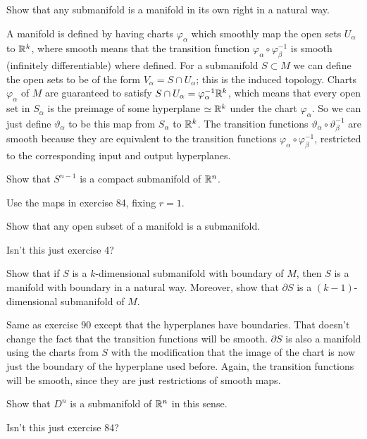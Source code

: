 \documentclass[a4paper,12pt]{report}
\numberwithin{equation}{section}
\begin{document}
\begin{p}%
{Show that any submanifold is a manifold in its own right in a natural way.}
\end{p}
{A manifold is defined by having charts $\varphi_\alpha$ which smoothly map the open sets $U_\alpha$ to $\mathbb{R}^k$, where smooth means that the transition function $\varphi_\alpha\circ\varphi_\beta^{-1}$ is smooth 
(infinitely differentiable) where defined. For a submanifold $S\subset M$ we can define the open sets to 
be of the form $V_\alpha=S\cap U_\alpha$; this is the induced topology. Charts $\varphi_\alpha$ of $M$ are
guaranteed to satisfy $S\cap U_\alpha=\varphi_\alpha^{-1}\mathbb{R}^k$, which means that every open set in $S_\alpha$ is the preimage of some hyperplane $\simeq\mathbb{R}^k$ under the chart $\varphi_\alpha$. So we can
just define $\vartheta_\alpha$ to be this map from $S_\alpha$ to $\mathbb{R}^k$. The transition functions
$\vartheta_\alpha\circ\vartheta_\beta^{-1}$ are smooth because they are equivalent to the transition
functions $\varphi_\alpha\circ\varphi_\beta^{-1}$, restricted to the corresponding input and output 
hyperplanes.}

\begin{p}%
{Show that $S^{n{-}1}$ is a compact submanifold of $\mathbb{R}^n$.}
\end{p}
{Use the maps in exercise 84, fixing $r=1$.}


\begin{p}%
{Show that any open subset of a manifold is a submanifold.}
\end{p}
{Isn't this just exercise 4?}

\begin{p}%
{Show that if $S$ is a $k$-dimensional submanifold 
with boundary of $M$, then $S$ is a manifold with boundary in a natural way. 
Moreover, show that $\partial S$ is a $(k{-}1)$-dimensional 
submanifold of $M$.}
\end{p}
{Same as exercise 90 except that the hyperplanes have boundaries.
That doesn't change the fact that the transition functions will be smooth. $\partial S$
is also a manifold using the charts from $S$ with the modification that the image of
the chart is now just the boundary of the hyperplane used before. Again, the transition
functions will be smooth, since they are just restrictions of smooth maps. }

\begin{p}%
{Show that $D^n$ is a submanifold of $\mathbb{R}^n$ in this sense.}
\end{p}
{Isn't this just 
exercise 84?}
\end{document}
